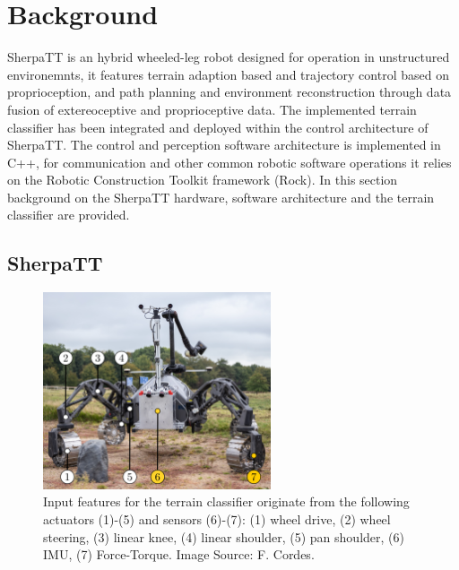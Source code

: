 \documentclass{article}
\begin{document}

\section{Background}


SherpaTT is an hybrid wheeled-leg robot designed for operation in unstructured environemnts, it features terrain adaption based and trajectory control based on proprioception, and path planning and environment reconstruction through data fusion of extereoceptive and proprioceptive data.
The implemented terrain classifier has been integrated and deployed within the control architecture of SherpaTT. 
The control and perception software architecture is implemented in C++, for communication and other common robotic software operations it relies on the Robotic Construction Toolkit framework (Rock). 
In this section background on the SherpaTT hardware, software architecture and the terrain classifier are provided.


\subsection{SherpaTT}



\begin{figure}[h]
\centering
\includegraphics[width=0.6\textwidth]{../figures/terrain_classifier_sensor_inputs.png}
\caption{\label{fig:SensorInputs}Input features for the terrain classifier originate from the following actuators (1)-(5) and sensors (6)-(7): (1) wheel drive, (2) wheel steering, (3) linear knee, (4) linear shoulder, (5) pan shoulder, (6) IMU, (7) Force-Torque. Image Source: F. Cordes.}
\end{figure}
\end{document}
